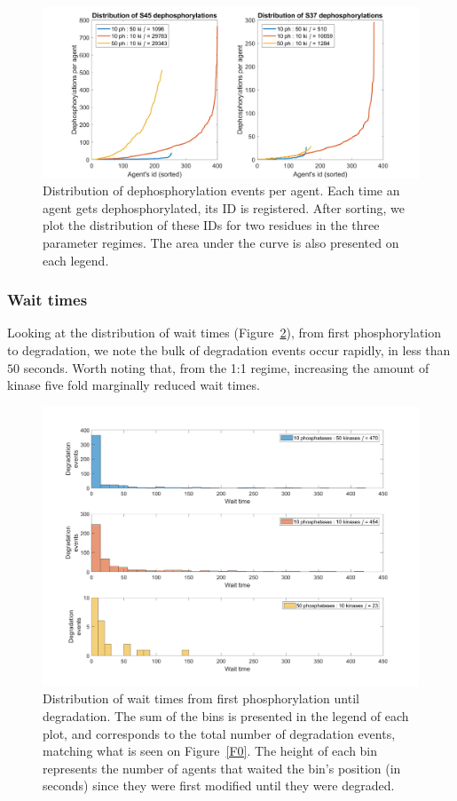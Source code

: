 \begin{figure}[h]
  \centering
  \includegraphics[width=\columnwidth]{wnt/F1_distribution_dephosphorylations_per_agent_brief.png}
  \caption{Distribution of dephosphorylation events per agent. Each
    time an agent gets dephosphorylated, its ID is registered. After
    sorting, we plot the distribution of these IDs for two
    residues in the three parameter regimes. The area under the curve
    is also presented on each legend.}
  \label{F1}
\end{figure}


\subsubsection*{Wait times}
Looking at the distribution of wait times (Figure~\ref{F2}), from first phosphorylation
to degradation, we note the bulk of degradation events occur rapidly,
in less than $50$ seconds. Worth noting that, from the 1:1 regime,
increasing the amount of kinase five fold marginally reduced wait
times.

\begin{figure}[h]
  \centering
  \includegraphics[width=\columnwidth]{wnt/F2_wait_times.png}
  \caption{Distribution of wait times from first phosphorylation until
    degradation. The sum of the bins is presented in the legend of each
    plot, and corresponds to the total number of degradation events, matching
		what is seen on Figure~\ref{F0}. The height of each bin represents the
		number of agents that waited the bin's position (in seconds)
		since they were first modified until they were degraded.}
  \label{F2}
\end{figure}


